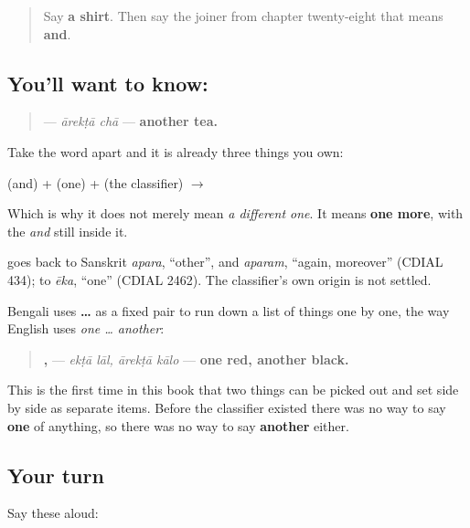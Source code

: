 \label{lesson:BN-C20-arekta}



\begin{quote}
Say \textbf{a shirt}. Then say the joiner from chapter twenty-eight that means \textbf{and}.
\end{quote}

\subsection*{You'll want to know: }
\begin{quote}
\textbf{ } — \emph{ārekṭā chā} — \textbf{another tea.}
\end{quote}

Take the word apart and it is already three things you own:

\textbf{} (and) + \textbf{} (one) + \textbf{} (the classifier) $\to$ \textbf{}

Which is why it does not merely mean \emph{a different one}. It means \textbf{one more}, with the \emph{and} still inside it.

\begin{cousinweb}
\textbf{} goes back to Sanskrit \emph{apara}, \textquotedblleft{}other\textquotedblright{}, and \emph{aparam}, \textquotedblleft{}again, moreover\textquotedblright{} (CDIAL 434); \textbf{} to \emph{ēka}, \textquotedblleft{}one\textquotedblright{} (CDIAL 2462). The classifier's own origin is not settled.
\end{cousinweb}

\begin{grammarlens}[title={Grammar Lens: the pair that hands things out one at a time}]
Bengali uses \textbf{ … } as a fixed pair to run down a list of things one by one, the way English uses \emph{one … another}:

\begin{quote}
\textbf{ ,  } — \emph{ekṭā lāl, ārekṭā kālo} — \textbf{one red, another black.}
\end{quote}

This is the first time in this book that two things can be picked out and set side by side as separate items. Before the classifier existed there was no way to say \textbf{one} of anything, so there was no way to say \textbf{another} either.
\end{grammarlens}

\subsection*{Your turn}
Say these aloud:

